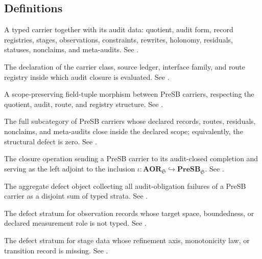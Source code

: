 \documentclass[11pt]{article}
\newcommand{\PreSB}{\mathbf{PreSB}}
\newcommand{\AOR}{\mathbf{AOR}}
\newcommand{\ClSB}{\mathrm{Cl}_{SB}}
\newcommand{\XiSB}{\Xi_{SB}}
\newcommand{\Sigobs}{\Sigma_{\mathrm{obs}}}
\newcommand{\Sigstage}{\Sigma_{\mathrm{stage}}}
\theoremstyle{definition}
\begin{document}
\subsection{Definitions}\label{subsec:definitions-list}

\begin{description}[style=nextline]
\item[PreSB carrier.]
A typed carrier together with its audit data: quotient, audit form,
record registries, stages, observations, constraints, rewrites,
holonomy, residuals, statuses, nonclaims, and meta-audits.  See
.

\item[Scope record.]
The declaration of the carrier class, source ledger, interface family,
and route registry inside which audit closure is evaluated.  See
.

\item[PreSB morphism.]
A scope-preserving field-tuple morphism between PreSB carriers,
respecting the quotient, audit, route, and registry structure.  See
.

\item[AOR subcategory.]
The full subcategory of PreSB carriers whose declared records, routes,
residuals, nonclaims, and meta-audits close inside the declared scope;
equivalently, the structural defect is zero.  See
.

\item[Closure completion functor $\ClSB$.]
The closure operation sending a PreSB carrier to its audit-closed
completion and serving as the left adjoint to the inclusion
$\iota:\AOR_{\mathfrak S}\hookrightarrow\PreSB_{\mathfrak S}$.  See
.

\item[Structural defect $\XiSB$.]
The aggregate defect object collecting all audit-obligation failures of
a PreSB carrier as a disjoint sum of typed strata.  See
.

\item[Observation stratum $\Sigobs$.]
The defect stratum for observation records whose target space,
boundedness, or declared measurement role is not typed.  See
.

\item[Stage stratum $\Sigstage$.]
The defect stratum for stage data whose refinement axis, monotonicity
law, or transition record is missing.  See
.


\end{description}
\end{document}
